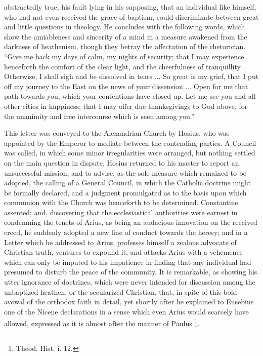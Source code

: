 abstractedly true; his fault lying in his supposing, that an
individual like himself, who had not even received the grace of
baptism, could discriminate between great and little questions in
theology. He concludes with the following words, which show the
amiableness and sincerity of a mind in a measure awakened from the
darkness of heathenism, though they betray the affectation of the
rhetorician. ``Give me back my days of calm, my nights of
security; that I may experience henceforth the comfort of the clear
light, and the cheerfulness of tranquillity. Otherwise, I shall sigh
and be dissolved in tears ... So great is my grief, that I put off my
journey to the East on the news of your dissension ... Open for me
that path towards you, which your contentions have closed up. Let me
see you and all other cities in happiness; that I may offer due
thanksgivings to God above, for the unanimity and free intercourse
which is seen among you.''

This letter was conveyed to the Alexandrian Church by Hosius, who
was appointed by the Emperor to mediate between the contending
parties. A Council was called, in which some minor irregularities were
arranged, but nothing settled on the main question in dispute. Hosius
returned to his master to report an unsuccessful mission, and to
advise, as the sole measure which remained to be adopted, the calling
of a General Council, in which the Catholic doctrine might be formally
declared, and a judgment promulgated as to the basis upon which
communion with the Church was henceforth to be determined. Constantine
assented; and, discovering that the ecclesiastical authorities were
earnest in condemning the tenets of Arius, as being an audacious
innovation on the received creed, he suddenly adopted a new line of
conduct towards the heresy; and in a Letter which he addressed to
Arius, professes himself a zealous advocate of Christian truth,
ventures to expound it, and attacks Arius with a vehemence which can
only be imputed to his impatience in finding that any individual had
presumed to disturb the peace of the community. It is remarkable, as
showing his utter ignorance of doctrines, which were never intended
for discussion among the unbaptized heathen, or the secularized
Christian, that, in spite of this bold avowal of the orthodox faith in
detail, yet shortly after he explained to Eusebius one of the Nicene
declarations in a sense which even Arius would scarcely have allowed,
expressed as it is almost after the manner of Paulus \footnote{Theod. Hist. i. 12.}.

